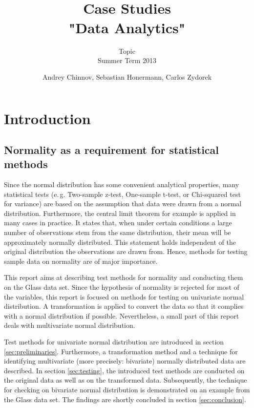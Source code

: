 \documentclass[a4paper, 12pt, titlepage, headsepline, listof = totoc, bibliography = totoc, numbers = noenddot]{scrartcl}
\title{\hrulefill \\ \vspace*{1cm} Case Studies\\\vspace*{0.5cm}
 "Data Analytics" \\ \vspace*{1cm}\hrulefill\vspace*{1.5cm}}
\subtitle{Topic\\\vspace*{1.5cm} Summer Term 2013\vspace*{1.5cm}}
\author{Andrey Chinnov, Sebastian Honermann, Carlos Zydorek}
\newcommand{\eg}{e.\,g. }
\begin{document}

\thispagestyle{empty}
\maketitle


\thispagestyle{empty}
\tableofcontents


\newpage
\setcounter{page}{1}
\section{Introduction}

\subsection{Normality as a requirement for statistical methods}

Since the normal distribution has some convenient analytical properties, many statistical tests (\eg Two-sample z-test, One-sample t-test, or Chi-squared test for variance) are based on the assumption that data were drawn from a normal distribution. Furthermore, the central limit theorem for example is applied in many cases in practice. It states that, when under certain conditions a large number of observations stem from the same distribution, their mean will be approximately normally distributed. This statement holds independent of the original distribution the observations are drawn from. Hence, methods for testing sample data on normality are of major importance. 

This report aims at describing test methods for normality and conducting them on the Glass data set. Since the hypothesis of normality is rejected for most of the variables, this report is focused on methods for testing on univariate normal distribution. A transformation is applied to convert the data so that it complies with a normal distribution if possible. Nevertheless, a small part of this report deals with multivariate normal distribution.

Test methods for univariate normal distribution are introduced in section \ref{sec:preliminaries}. Furthermore, a transformation method and a technique for identifying multivariate (more precisely: bivariate) normally distributed data are described. In section \ref{sec:testing}, the introduced test methods are conducted on the original data as well as on the transformed data. Subsequently, the technique for checking on bivariate normal distribution is demonstrated on an example from the Glass data set. The findings are shortly concluded in section \ref{sec:conclusion}.
\end{document}
